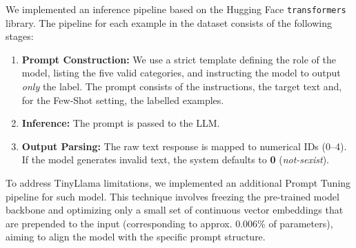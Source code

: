 \documentclass[11pt]{article}
\begin{document}
We implemented an inference pipeline based on the Hugging Face \texttt{transformers} library. The pipeline for each example in the dataset consists of the following stages:
\begin{enumerate}
    \item \textbf{Prompt Construction:} We use a strict template defining the role of the model, listing the five valid categories, and instructing the model to output \textit{only} the label. The prompt consists of the instructions, the target text and, for the Few-Shot setting, the labelled examples.
    \item \textbf{Inference:} The prompt is passed to the LLM.
    \item \textbf{Output Parsing:} The raw text response is mapped to numerical IDs (0–4). If the model generates invalid text, the system defaults to \textbf{0} (\textit{not-sexist}).
\end{enumerate}

To address TinyLlama limitations, we implemented an additional Prompt Tuning pipeline for such model. This technique involves freezing the pre-trained model backbone and optimizing only a small set of continuous vector embeddings that are prepended to the input (corresponding to approx. 0.006\% of parameters), aiming to align the model with the specific prompt structure.



\end{document}
